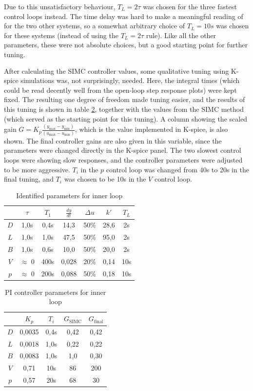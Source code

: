 \documentclass[12pt]{article}
\begin{document}
Due to this unsatisfactory behaviour, $T_L = 2\tau$ was chosen for the three fastest control loops instead. The time delay was hard to make a meaningful reading of for the two other systems, so a somewhat arbitrary choice of $T_L = 10s$ was chosen for these systems (instead of using the $T_L = 2\tau$ rule). Like all the other parameters, these were not absolute choices, but a good starting point for further tuning.

After calculating the SIMC controller values, some qualitative tuning using K-spice simulations was, not surprisingly, needed. Here, the integral times (which could be read decently well from the open-loop step response plots) were kept fixed. The resulting one degree of freedom made tuning easier, and the results of this tuning is shown in table \ref{tab:inner_loop_PI_parameters}, together with the values from the SIMC method (which served as the starting point for this tuning). A column showing the scaled gain $G = K_p \frac{(y_{\max} - y_{\min})}{(u_{\max} - u_{\min})}$, which is the value implemented in K-spice, is also shown. The final controller gains are also given in this variable, since the parameters were changed directly in the K-spice panel. The two slowest control loops were showing slow responses, and the controller parameters were adjusted to be more aggressive. $T_i$ in the $p$ control loop was changed from 40s to 20s in the final tuning, and $T_i$ was chosen to be 10s in the $V$ control loop.


\begin{table}
\centering
\begin{tabular}{c | c | c | c | c | c || c}
& $\tau$ & $T_1$ & $\frac{dy}{dt}$ & $\Delta u$ & $k'$ & $T_L$ \\ \hline
$D$ & 1,0s & 0,4s & 14,3 & 50\% & 28,6 & 2s \\
$L$ & 1,0s & 1,0s & 47,5 & 50\% & 95,0 & 2s \\
$B$ & 1,0s & 0,6s & 10,0 & 50\% & 20,0 & 2s \\
$V$ & $\approx$ 0 & 400s & 0,028 & 20\% & 0,14 & 10s \\
$p$ & $\approx$ 0 & 200s & 0,088 & 50\% & 0,18 & 10s
\end{tabular}
\caption{Identified parameters for inner loop}
\label{tab:inner_loop_step_responses}
\end{table}


\begin{table}
\centering
\begin{tabular}{c | c | c | c | c}
& $K_p$ & $T_i$ & $G_{\textrm{SIMC}}$ & $G_{\textrm{final}}$ \\ \hline
$D$ & 0,0035 & 0,4s & 0,42 & 0,42\\
$L$ & 0,0018 & 1,0s & 0,22 & 0,22\\
$B$ & 0,0083 & 1,0s & 1,0 & 0,30 \\
$V$ & 0,71 & 10s & 86 & 200 \\
$p$ & 0,57 & 20s & 68 & 30
\end{tabular}
\caption{PI controller parameters for inner loop}
\label{tab:inner_loop_PI_parameters}
\end{table}
\end{document}
